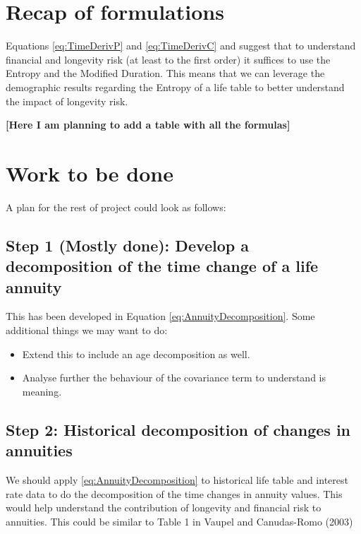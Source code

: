 \documentclass[12pt]{article}
\begin{document}
\section{Recap of formulations}


  Equations \ref{eq:TimeDerivP} and \ref{eq:TimeDerivC} and suggest that to understand financial and longevity risk (at least to the first order) it suffices to use the Entropy and the Modified Duration. This means that we can leverage the demographic results regarding the Entropy of a life table to better understand the impact of longevity risk.


\textbf{[Here I am planning to add a table with all the formulas]}



\section{Work to be done}\label{work-to-be-done}

A plan for the rest of project could look as follows:


\subsection{Step 1 (Mostly done): Develop a decomposition of the time
change of a life
annuity}

This has been developed in Equation \eqref{eq:AnnuityDecomposition}.
Some additional things we may want to do:

\begin{itemize}

\item
  Extend this to include an age decomposition as well.
\item
  Analyse further the behaviour of the covariance term to understand is
  meaning.
\end{itemize}


\subsection{Step 2: Historical decomposition of changes in
annuities}

We should apply \eqref{eq:AnnuityDecomposition} to historical life table
and interest rate data to do the decomposition of the time changes in
annuity values. This would help understand the contribution of longevity
and financial risk to annuities. This could be similar to Table 1 in
Vaupel and Canudas-Romo (2003)
\end{document}

